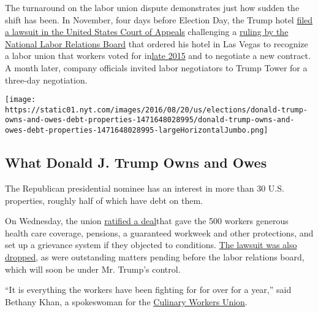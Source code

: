 The turnaround on the labor union dispute demonstrates just how sudden
the shift has been. In November, four days before Election Day, the
Trump hotel
\href{https://dockets.justia.com/docket/circuit-courts/cadc/16-1386}{filed
a lawsuit in the United States Court of Appeals} challenging a
\href{http://www.culinaryunion226.org/news/press/body/2016-11-03-NLRB-decision-and-order-re-TRUMP.pdf}{ruling
by the National Labor Relations Board} that ordered his hotel in Las
Vegas to recognize a labor union that workers voted for
in\href{http://www.culinaryunion226.org/news/press/trump-las-vegas-workers-vote-yes-to-join-the-union-in-nlrb-election-culinary-union-calls-for-immediate-contract-negotiations}{late
2015} and to negotiate a new contract. A month later, company officials
invited labor negotiators to Trump Tower for a three-day negotiation.

\href{https://www.nytimes.com/interactive/2016/08/20/us/elections/donald-trump-owns-and-owes-debt-properties.html}{}

\texttt{[image: https://static01.nyt.com/images/2016/08/20/us/elections/donald-trump-owns-and-owes-debt-properties-1471648028995/donald-trump-owns-and-owes-debt-properties-1471648028995-largeHorizontalJumbo.png]}

\hypertarget{what-donald-j-trump-owns-and-owes}{%
\subsection{What Donald J. Trump Owns and
Owes}\label{what-donald-j-trump-owns-and-owes}}

The Republican presidential nominee has an interest in more than 30 U.S.
properties, roughly half of which have debt on them.

On Wednesday, the union
\href{http://www.culinaryunion226.org/news/press/unite-here-unions-reach-agreements-with-trump-hotels-in-las-vegas-and-washington-d-c}{ratified
a deal}that gave the 500 workers generous health care coverage,
pensions, a guaranteed workweek and other protections, and set up a
grievance system if they objected to conditions.
\href{https://assets.documentcloud.org/documents/3245561/Trump-Hotel-20161221.pdf}{The
lawsuit was also dropped}, as were outstanding matters pending before
the labor relations board, which will soon be under Mr. Trump's control.

``It is everything the workers have been fighting for for over for a
year,'' said Bethany Khan, a spokeswoman for the
\href{http://www.culinaryunion226.org/}{Culinary Workers Union}.

